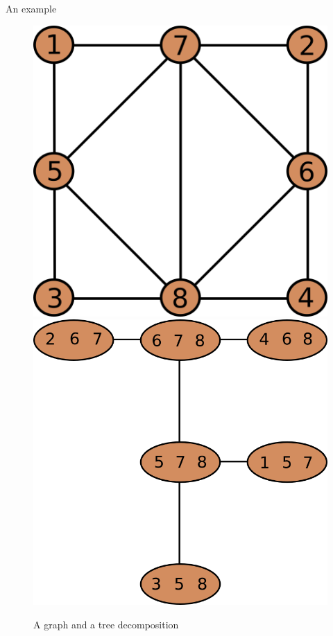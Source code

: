 \documentclass{beamer}
\begin{document}
\begin{frame}{An example}
\begin{figure}
    \includegraphics[scale=0.3]{g1107.png}
    \hspace{1cm}
    \includegraphics[scale=0.2]{treedecomp.png}
    \caption*{A graph and a tree decomposition}
\end{figure}
\end{frame}
\end{document}
